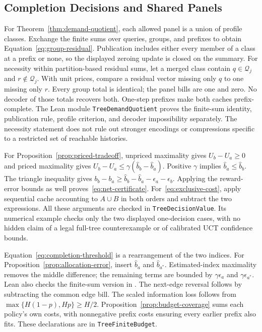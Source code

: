 \subsection{Completion Decisions and Shared Panels}
For Theorem~\ref{thm:demand-quotient}, each allowed panel is a union of profile
classes. Exchange the finite sums over queries, groups, and prefixes to obtain
Equation~\eqref{eq:group-residual}. Publication includes either every member of
a class at a prefix or none, so the displayed zeroing update is closed on the
summary. For necessity within partition-based residual sums, let a merged
class contain $q\in\mathcal Q_j$ and $r\notin\mathcal Q_j$. With unit prices,
compare a residual vector missing only $q$ to one missing only $r$. Every
group total is identical; the panel bills are one and zero. No decoder of
those totals recovers both. One-step prefixes make both caches prefix-complete.
The Lean module \texttt{TreeDemandQuotient} proves the finite-sum identity,
publication rule, profile criterion, and decoder impossibility separately.
The necessity statement does not rule out stronger encodings or compressions
specific to a restricted set of reachable histories.

For Proposition~\ref{prop:priced-tradeoff}, unpriced maximality gives
$U_b-U_a\ge0$ and priced maximality gives
$U_b-U_a\le\gamma(\widehat b_b-\widehat b_a)$.
Positive $\gamma$ implies $\widehat b_a\le\widehat b_b$.
The triangle inequality gives
$b_b-b_a\ge\widehat b_b-\widehat b_a-\epsilon_a-\epsilon_b$.
Applying the reward-error bounds as well proves~\eqref{eq:net-certificate}.
For~\eqref{eq:exclusive-cost}, apply sequential cache accounting to $A\cup B$
in both orders and subtract the two expressions. All these arguments are
checked in \texttt{TreeDecisionValue}. Its numerical example checks only the
two displayed one-decision cases, with no hidden claim of a legal full-tree
counterexample or of calibrated UCT confidence bounds.

Equation~\eqref{eq:completion-threshold} is a rearrangement of the two indices.
For Proposition~\ref{prop:allocation-error}, insert $\widehat b_a$ and
$\widehat b_{a^*}$. Estimated-index maximality removes the middle difference;
the remaining terms are bounded by $\gamma\epsilon_a$ and
$\gamma\epsilon_{a^*}$. Lean also checks the finite-sum version in
. The next-edge reversal follows
by subtracting the common edge bill. The scaled information loss follows from
$\max\{H(1-p),Hp\}\ge H/2$. Proposition~\ref{prop:budget-coverage} sums each
policy's own costs, with nonnegative prefix costs ensuring every earlier
prefix also fits. These declarations are in \texttt{TreeFiniteBudget}.

